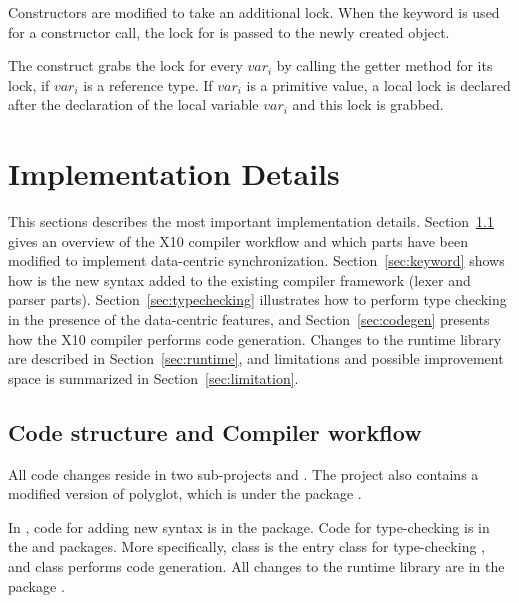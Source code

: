 \documentclass{article}
\begin{document}
Constructors are modified to take an additional lock. When the  keyword is used for a constructor call, the lock for  is passed to the newly created object.

The construct  grabs the lock for every $var_i$ by calling the getter method for its lock, if $var_i$ is a reference type.
If $var_i$ is a primitive value, a local lock is declared after the declaration of the local variable $var_i$ and this lock is grabbed.

\section{Implementation Details}
\label{sec:details}

This sections describes the most important implementation details. Section~\ref{sec:code} gives an overview of the X10 compiler workflow and which parts  have been modified to implement data-centric synchronization. Section~\ref{sec:keyword} shows how is the new syntax added to the existing compiler framework (lexer and parser parts). Section~\ref{sec:typechecking} illustrates how to perform type checking in the presence of the  data-centric features, and Section~\ref{sec:codegen} presents how the X10 compiler performs code generation. Changes to the runtime library are described in Section~\ref{sec:runtime}, and limitations and possible improvement space is summarized in Section~\ref{sec:limitation}.

\subsection{Code structure and Compiler workflow}
\label{sec:code}

All code changes reside in two sub-projects  and
. The project  also contains a modified version of polyglot, which is under the package .

In ,  code for adding new syntax  is in the  package. Code for type-checking is in the  and  packages. More specifically, class  is the entry class for type-checking , and class  performs  code generation. All changes to the runtime library are in the package . 
\end{document}
